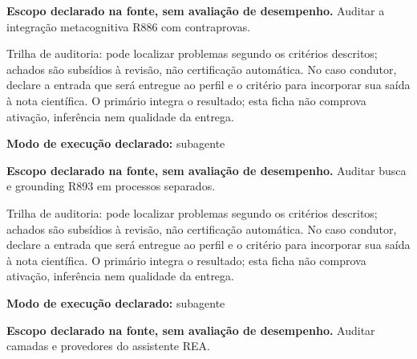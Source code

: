 \begin{descricao}
\textbf{Escopo declarado na fonte, sem avaliação de desempenho.}
Auditar a integração metacognitiva R886 com contraprovas.
\end{descricao}

\begin{funcao}
Trilha de auditoria: pode localizar problemas segundo os critérios descritos; achados são subsídios à revisão, não certificação automática. No caso condutor, declare a entrada que será entregue ao perfil e o critério para incorporar sua saída à nota científica. O primário integra o resultado; esta ficha não comprova ativação, inferência nem qualidade da entrega.
\end{funcao}

\begin{arquitetura}
\textbf{Modo de execução declarado:} subagente
\end{arquitetura}


\begin{descricao}
\textbf{Escopo declarado na fonte, sem avaliação de desempenho.}
Auditar busca e grounding R893 em processos separados.
\end{descricao}

\begin{funcao}
Trilha de auditoria: pode localizar problemas segundo os critérios descritos; achados são subsídios à revisão, não certificação automática. No caso condutor, declare a entrada que será entregue ao perfil e o critério para incorporar sua saída à nota científica. O primário integra o resultado; esta ficha não comprova ativação, inferência nem qualidade da entrega.
\end{funcao}

\begin{arquitetura}
\textbf{Modo de execução declarado:} subagente
\end{arquitetura}


\begin{descricao}
\textbf{Escopo declarado na fonte, sem avaliação de desempenho.}
Auditar camadas e provedores do assistente REA.
\end{descricao}

